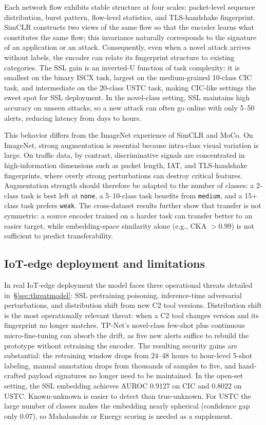 \documentclass[sensors,article,submit,moreauthors]{Definitions/mdpi}
\begin{document}
Each network flow exhibits stable structure at four scales: packet-level sequence distribution, burst pattern, flow-level statistics, and TLS-handshake fingerprint. SimCLR constructs two views of the same flow so that the encoder learns what constitutes the same flow; this invariance naturally corresponds to the signature of an application or an attack. Consequently, even when a novel attack arrives without labels, the encoder can relate its fingerprint structure to existing categories. The SSL gain is an inverted-U function of task complexity: it is smallest on the binary ISCX task, largest on the medium-grained 10-class CIC task, and intermediate on the 20-class USTC task, making CIC-like settings the sweet spot for SSL deployment. In the novel-class setting, SSL maintains high accuracy on unseen attacks, so a new attack can often go online with only 5--50 alerts, reducing latency from days to hours.

This behavior differs from the ImageNet experience of SimCLR and MoCo. On ImageNet, strong augmentation is essential because intra-class visual variation is large. On traffic data, by contrast, discriminative signals are concentrated in high-information dimensions such as packet length, IAT, and TLS-handshake fingerprints, where overly strong perturbations can destroy critical features. Augmentation strength should therefore be adapted to the number of classes: a 2-class task is best left at \texttt{none}, a 5--10-class task benefits from \texttt{medium}, and a 15+ class task prefers \texttt{weak}. The cross-dataset results further show that transfer is not symmetric: a source encoder trained on a harder task can transfer better to an easier target, while embedding-space similarity alone (e.g., CKA $> 0.99$) is not sufficient to predict transferability.

\subsection{IoT-edge deployment and limitations}
\label{sec:soc}

In real IoT-edge deployment the model faces three operational threats detailed in~\S\ref{sec:threatmodel}: SSL pretraining poisoning, inference-time adversarial perturbations, and distribution shift from new C2 tool versions. Distribution shift is the most operationally relevant threat: when a C2 tool changes version and its fingerprint no longer matches, TP-Net's novel-class few-shot plus continuous micro-fine-tuning can absorb the drift, as five new alerts suffice to rebuild the prototype without retraining the encoder. The resulting security gains are substantial: the retraining window drops from 24--48 hours to hour-level 5-shot labeling, manual annotation drops from thousands of samples to five, and hand-crafted payload signatures no longer need to be maintained. In the open-set setting, the SSL embedding achieves AUROC 0.9127 on CIC and 0.8022 on USTC. Known-unknown is easier to detect than true-unknown. For USTC the large number of classes makes the embedding nearly spherical (confidence gap only 0.07), so Mahalanobis or Energy scoring is needed as a supplement.
\end{document}
